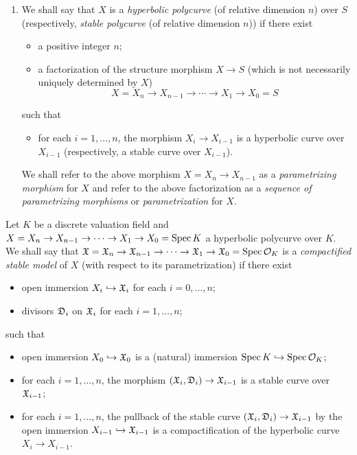 \begin{defn}
\begin{enumerate}
\begin{itemize}
        \item $X$ is isomorphic to $X^\cpt \setminus D$ as a scheme over $S$.
      \end{itemize}
    \item We shall say that $X$ is a \emph{hyperbolic polycurve} (of relative dimension $n$) over $S$ (respectively, \emph{stable polycurve} (of relative dimension $n$)) if there exist
      \begin{itemize}
        \item a positive integer $n$;
        \item a factorization of the structure morphism $X \to S$ (which is not necessarily uniquely determined by $X$) \[X = X_n \to X_{n - 1} \to \cdots \to X_1 \to X_0 = S\]
      \end{itemize}
    such that
      \begin{itemize}
        \item for each $i = 1, \ldots, n$, the morphism $X_i \to X_{i - 1}$ is a hyperbolic curve over $X_{i - 1}$ (respectively, a stable curve over $X_{i - 1}$).
      \end{itemize}
    We shall refer to the above morphism $X = X_n \to X_{n - 1}$ as a \emph{parametrizing morphism} for $X$ and refer to the above factorization as a \emph{sequence of parametrizing morphisms} or \emph{parametrization} for $X$.
  \end{enumerate}
\end{defn}

\begin{defn}
  Let $K$ be a discrete valuation field and $X = X_n \to X_{n - 1} \to \cdots \to X_1 \to X_0 = \mathrm{Spec} \, K$ a hyperbolic polycurve over $K$. We shall say that $\mathfrak{X} = \mathfrak{X}_n \to \mathfrak{X}_{n - 1} \to \cdots \to \mathfrak{X}_1 \to \mathfrak{X}_0 = \mathrm{Spec} \, \mathcal{O}_K$ is a \emph{compactified stable model} of $X$ (with respect to its parametrization) if there exist
  \begin{itemize}
    \item open immersion $X_i \hookrightarrow \mathfrak{X}_i$ for each $i = 0, \ldots, n$;
    \item divisors $\mathfrak{D}_i$ on $\mathfrak{X}_i$ for each $i = 1, \ldots, n$;
  \end{itemize}
  such that
  \begin{itemize}
    \item open immersion $X_0 \hookrightarrow \mathfrak{X}_0$ is a (natural) immersion $\mathrm{Spec} \, K \hookrightarrow \mathrm{Spec} \, \mathcal{O}_K$;
    \item for each $i = 1, \ldots, n$, the morphism $(\mathfrak{X}_i, \mathfrak{D}_i) \to \mathfrak{X}_{i - 1}$ is a stable curve over $\mathfrak{X}_{i - 1}$;
    \item for each $i = 1, \ldots, n$, the pullback of the stable curve $(\mathfrak{X}_i, \mathfrak{D}_i) \to \mathfrak{X}_{i - 1}$ by the open immersion $X_{i - 1} \hookrightarrow \mathfrak{X}_{i - 1}$ is a compactification of the hyperbolic curve $X_i \to X_{i - 1}$.
  \end{itemize}
\end{defn}

